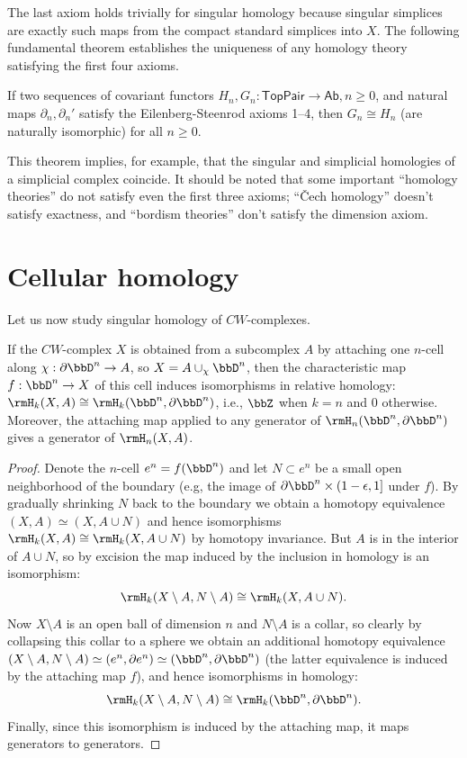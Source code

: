 The last axiom holds trivially for singular homology because singular simplices are exactly such maps from the compact standard simplices into $X$. The following fundamental theorem establishes the uniqueness of any homology theory satisfying the first four axioms.


\begin{thm}
    If two sequences of covariant functors $H_n,G_n:\mathsf{TopPair}\to \mathsf{Ab}, n\geq 0$, and natural maps $\partial_n,\partial_n '$ satisfy the Eilenberg-Steenrod axioms 1--4, then $G_n\cong H_n$ (are naturally isomorphic) for all $n\geq 0$.
\end{thm}

 This theorem implies, for example, that the singular and simplicial homologies of a simplicial complex coincide. It should be noted that some important ``homology theories'' do not satisfy even the first three axioms; ``\v Cech homology'' doesn't satisfy exactness, and ``bordism theories'' don't satisfy the dimension axiom.


\section{Cellular homology}

Let us now study singular homology of $CW$-complexes.


\begin{prop}\label{lem 39.1 munkres}
    If the $CW$-complex $X$ is obtained from a subcomplex $A$ by attaching one $n$-cell along $\chi:\partial \bbD^n\to A$, so $X=A\cup_\chi \bbD^n$, then the characteristic map $f:\bbD^n\to X$ of this cell induces isomorphisms in relative homology: $\rmH_k(X,A)\cong \rmH_k(\bbD^n,\partial \bbD^n)$, i.e., $\bbZ$ when $k=n$ and $0$ otherwise. Moreover, the attaching map applied to any generator of $\rmH_n(\bbD^n,\partial \bbD^n)$ gives a generator of $\rmH_n(X,A)$.
\end{prop}
\begin{proof}
    Denote the $n$-cell $e^n=f(\bbD^n)$ and let $N\subset e^n$ be a small open neighborhood of the boundary (e.g, the image of $\partial \bbD^n\times (1-\epsilon,1]$ under $f$). By gradually shrinking $N$ back to the boundary we obtain a homotopy equivalence $(X,A)\simeq (X,A\cup N)$ and hence isomorphisms $\rmH_k(X,A)\cong \rmH_k(X,A\cup N)$ by homotopy invariance. But $A$ is in the interior of $A\cup N$, so by excision the map induced by the inclusion in homology is an isomorphism:
    \[\rmH_k(X\setminus A,N\setminus A)\cong \rmH_k(X,A\cup N).\]
    Now $X\setminus A$ is an open ball of dimension $n$ and $N\setminus A$ is a collar, so clearly by collapsing this collar to a sphere we obtain an additional homotopy equivalence $(X\setminus A,N\setminus A)\simeq (e^n,\partial e^n)\simeq (\bbD^n,\partial \bbD^n)$ (the latter equivalence is induced by the attaching map $f$), and hence isomorphisms in homology:
    \[\rmH_k(X\setminus A,N\setminus A)\cong \rmH_k(\bbD^n,\partial \bbD^n).\]
    Finally, since this isomorphism is induced by the attaching map, it maps generators to generators.
\end{proof}

